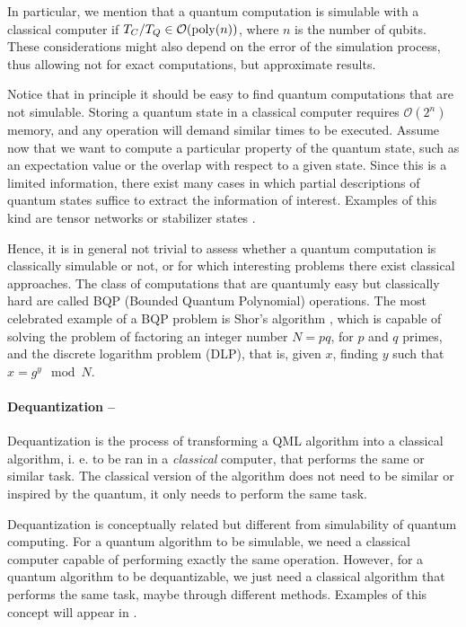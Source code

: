 \documentclass[]{report}
\begin{document}
In particular, we mention that a quantum computation is simulable with a classical computer if $T_C / T_Q \in \mathcal O({\rm poly} (n))$, where $n$ is the number of qubits. These considerations might also depend on the error of the simulation process, thus allowing not for exact computations, but approximate results. 

Notice that in principle it should be easy to find quantum computations that are not simulable. Storing a quantum state in a classical computer requires $\mathcal O(2^n)$ memory, and any operation will demand similar times to be executed. Assume now that we want to compute a particular property of the quantum state, such as an expectation value or the overlap with respect to a given state. Since this is a limited information, there exist many cases in which partial descriptions of quantum states suffice to extract the information of interest. Examples of this kind are tensor networks \cite{orus2014practical} or stabilizer states \cite{gottesman1998heisenberg}. 

Hence, it is in general not trivial to assess whether a quantum computation is classically simulable or not, or for which interesting problems there exist classical approaches. The class of computations that are quantumly easy but classically hard are called BQP (Bounded Quantum Polynomial) operations. The most celebrated example of a BQP problem is Shor's algorithm \cite{shor1997polynomialtime}, which is capable of solving the problem of factoring an integer number $N = pq$, for $p$ and $q$ primes, and the discrete logarithm problem (DLP), that is, given $x$, finding $y$ such that $x = g^y \mod N$.

\paragraph{Dequantization --} Dequantization is the process of transforming a QML algorithm into a classical algorithm, i. e. to be ran in a \textit{classical} computer, that performs the same or similar task. The classical version of the algorithm does not need to be similar or inspired by the quantum, it only needs to perform the same task. 

Dequantization is conceptually related but different from simulability of quantum computing. For a quantum algorithm to be simulable, we need a classical computer capable of performing exactly the same operation. However, for a quantum algorithm to be dequantizable, we just need a classical algorithm that performs the same task, maybe through different methods. Examples of this concept will appear in .
\end{document}
